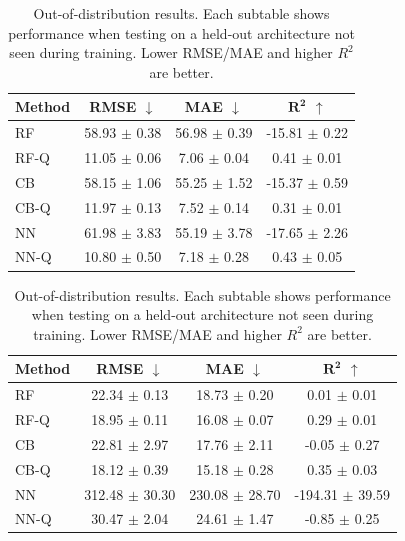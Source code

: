 \begin{table}[t]
    \centering
    \caption{Out-of-distribution results. Each subtable shows performance when testing on a held-out architecture not seen during training. Lower RMSE/MAE and higher $R^2$ are better.}
    \label{tab:ood-results}
    \vspace{0.5em}
    \begin{minipage}{0.48\textwidth}
        \centering
        \label{tab:ood-adalovelace}
        \begin{tabular}{lccc}
            \toprule
            \textbf{Method} & \textbf{RMSE} $\downarrow$ & \textbf{MAE} $\downarrow$ & $\boldsymbol{R^2}$ $\uparrow$ \\
            \midrule
            RF      & 58.93 $\pm$ 0.38 & 56.98 $\pm$ 0.39 & -15.81 $\pm$ 0.22 \\
            RF-Q    & 11.05 $\pm$ 0.06 & 7.06 $\pm$ 0.04 & 0.41 $\pm$ 0.01 \\
            \midrule
            CB      & 58.15 $\pm$ 1.06 & 55.25 $\pm$ 1.52 & -15.37 $\pm$ 0.59 \\
            CB-Q    & 11.97 $\pm$ 0.13 & 7.52 $\pm$ 0.14 & 0.31 $\pm$ 0.01 \\
            \midrule
            NN      & 61.98 $\pm$ 3.83 & 55.19 $\pm$ 3.78 & -17.65 $\pm$ 2.26 \\
            NN-Q    & 10.80 $\pm$ 0.50 & 7.18 $\pm$ 0.28 & 0.43 $\pm$ 0.05 \\
            \bottomrule
        \end{tabular}
    \end{minipage}
    \hfill
    \begin{minipage}{0.48\textwidth}
        \centering
        \label{tab:ood-k80}
        \begin{tabular}{lccc}
            \toprule
            \textbf{Method} & \textbf{RMSE} $\downarrow$ & \textbf{MAE} $\downarrow$ & $\boldsymbol{R^2}$ $\uparrow$ \\
            \midrule
            RF      & 22.34 $\pm$ 0.13 & 18.73 $\pm$ 0.20 & 0.01 $\pm$ 0.01 \\
            RF-Q    & 18.95 $\pm$ 0.11 & 16.08 $\pm$ 0.07 & 0.29 $\pm$ 0.01 \\
            \midrule
            CB      & 22.81 $\pm$ 2.97 & 17.76 $\pm$ 2.11 & -0.05 $\pm$ 0.27 \\
            CB-Q    & 18.12 $\pm$ 0.39 & 15.18 $\pm$ 0.28 & 0.35 $\pm$ 0.03 \\
            \midrule
            NN      & 312.48 $\pm$ 30.30 & 230.08 $\pm$ 28.70 & -194.31 $\pm$ 39.59 \\
            NN-Q    & 30.47 $\pm$ 2.04 & 24.61 $\pm$ 1.47 & -0.85 $\pm$ 0.25 \\
            \bottomrule
        \end{tabular}
    \end{minipage}


\end{table}
